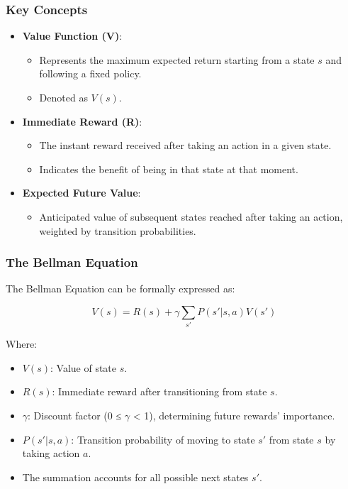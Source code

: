 \documentclass[aspectratio=169]{beamer}
\begin{document}
\begin{frame}[fragile]
    \frametitle{Key Concepts}

    \begin{itemize}
        \item \textbf{Value Function (V)}:
        \begin{itemize}
            \item Represents the maximum expected return starting from a state \( s \) and following a fixed policy.
            \item Denoted as \( V(s) \).
        \end{itemize}

        \item \textbf{Immediate Reward (R)}:
        \begin{itemize}
            \item The instant reward received after taking an action in a given state.
            \item Indicates the benefit of being in that state at that moment.
        \end{itemize}

        \item \textbf{Expected Future Value}:
        \begin{itemize}
            \item Anticipated value of subsequent states reached after taking an action, weighted by transition probabilities.
        \end{itemize}
    \end{itemize}
\end{frame}

\begin{frame}[fragile]
    \frametitle{The Bellman Equation}

    The Bellman Equation can be formally expressed as:

    \begin{equation}
        V(s) = R(s) + \gamma \sum_{s'} P(s' | s, a) V(s')
    \end{equation}

    Where:
    \begin{itemize}
        \item \( V(s) \): Value of state \( s \).
        \item \( R(s) \): Immediate reward after transitioning from state \( s \).
        \item \( \gamma \): Discount factor (0 ≤ \( \gamma \) < 1), determining future rewards' importance.
        \item \( P(s' | s, a) \): Transition probability of moving to state \( s' \) from state \( s \) by taking action \( a \).
        \item The summation accounts for all possible next states \( s' \).
    \end{itemize}
\end{frame}
\end{document}
